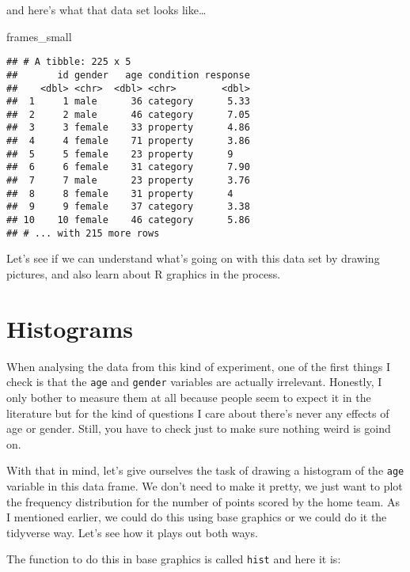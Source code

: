 \documentclass[]{book}
\newenvironment{Shaded}{\begin{snugshade}}{\end{snugshade}}
\newcommand{\KeywordTok}[1]{\textcolor[rgb]{0.13,0.29,0.53}{\textbf{#1}}}
\newcommand{\NormalTok}[1]{#1}
\newcommand{\OperatorTok}[1]{\textcolor[rgb]{0.81,0.36,0.00}{\textbf{#1}}}
\begin{document}
and here's what that data set looks like\ldots{}

\begin{Shaded}
\begin{Highlighting}[]
\NormalTok{frames_small}
\end{Highlighting}
\end{Shaded}

\begin{verbatim}
## # A tibble: 225 x 5
##       id gender   age condition response
##    <dbl> <chr>  <dbl> <chr>        <dbl>
##  1     1 male      36 category      5.33
##  2     2 male      46 category      7.05
##  3     3 female    33 property      4.86
##  4     4 female    71 property      3.86
##  5     5 female    23 property      9   
##  6     6 female    31 category      7.90
##  7     7 male      23 property      3.76
##  8     8 female    31 property      4   
##  9     9 female    37 category      3.38
## 10    10 female    46 category      5.86
## # ... with 215 more rows
\end{verbatim}

Let's see if we can understand what's going on with this data set by drawing pictures, and also learn about R graphics in the process.

\hypertarget{histograms}{%
\section{Histograms}\label{histograms}}

When analysing the data from this kind of experiment, one of the first things I check is that the \texttt{age} and \texttt{gender} variables are actually irrelevant. Honestly, I only bother to measure them at all because people seem to expect it in the literature but for the kind of questions I care about there's never any effects of age or gender. Still, you have to check just to make sure nothing weird is goind on.

With that in mind, let's give ourselves the task of drawing a histogram of the \texttt{age} variable in this data frame. We don't need to make it pretty, we just want to plot the frequency distribution for the number of points scored by the home team. As I mentioned earlier, we could do this using base graphics or we could do it the tidyverse way. Let's see how it plays out both ways.

The function to do this in base graphics is called \texttt{hist} and here it is:

\begin{Shaded}
\end{Shaded}
\end{document}
